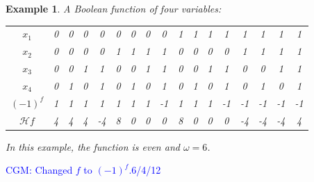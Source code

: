 \documentclass[12pt]{article}
\def\blue#1{\textcolor{blue}{#1}}
\newcommand{\cgm}[1]{\blue{CGM: #1}}
\newtheorem{example}[theorem]{Example}
\begin{document}
\begin{example}
\label{example:4vars}
A Boolean function of four variables:

\begin{center}
\begin{tabular}{c|cccccccc cccccccc}
$x_1$                    & 0 & 0 & 0 & 0 & 0 & 0 & 0 & 0 & 1 & 1 & 1 & 1 & 1 & 1 & 1 & 1\\
$x_2$                    & 0 & 0 & 0 & 0 & 1 & 1 & 1 & 1 & 0 & 0 & 0 & 0 & 1 & 1 & 1 & 1\\
$x_3$                    & 0 & 0 & 1 & 1 & 0 & 0 & 1 & 1 & 0 & 0 & 1 & 1 & 0 & 0 & 1 & 1\\
$x_4$                    & 0 & 1 & 0 & 1 & 0 & 1 & 0 & 1 & 0 & 1 & 0 & 1 & 0 & 1 & 0 & 1\\ \hline
$(-1)^f$                        & 1 & 1  & 1  & 1  & 1   & 1 & 1 & -1  & 1 & 1 & 1 & -1 & -1 & -1 & -1 & -1 \\
${\mathcal{H}}f$   & 4 & 4 & 4 & -4 & 8 & 0 & 0 & 0 & 8 & 0 & 0 & 0 & -4 & -4 & -4 & 4  \\
\end{tabular}
\end{center}
In this example, the function is even and $\omega = 6$.
\end{example}

\cgm{Changed $f$ to $(-1)^f$.6/4/12}



\end{document}
